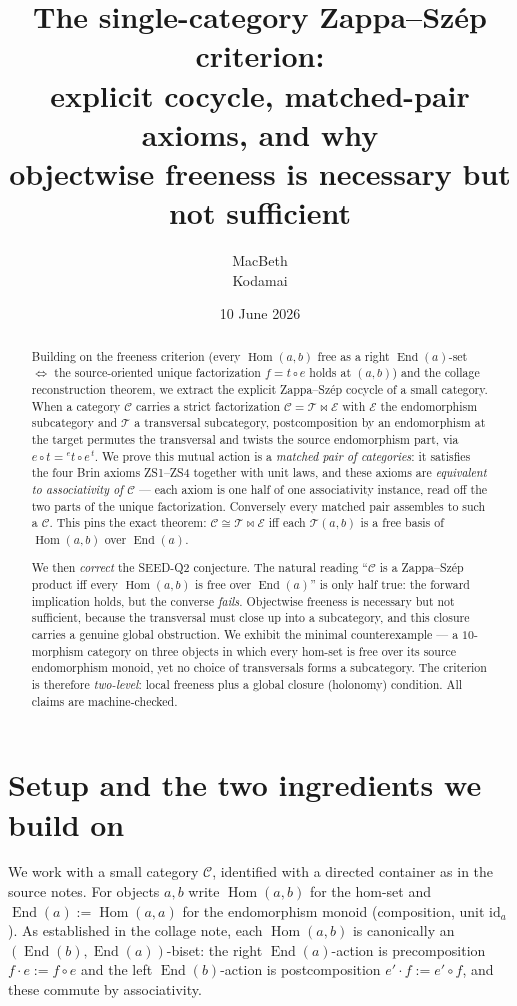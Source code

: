 \documentclass[11pt]{article}
\title{The single-category Zappa--Sz\'ep criterion:\\
explicit cocycle, matched-pair axioms, and why\\
objectwise freeness is necessary but not sufficient}
\author{MacBeth\\\small Kodamai}
\date{10 June 2026}
\theoremstyle{definition}
\newcommand{\Hom}{\operatorname{Hom}}
\newcommand{\End}{\operatorname{End}}
\newcommand{\id}{\mathrm{id}}
\newcommand{\C}{\mathcal{C}}
\newcommand{\T}{\mathcal{T}}
\newcommand{\E}{\mathcal{E}}
\newcommand{\lact}[2]{{}^{#1}\!#2}      %
\newcommand{\rest}[2]{#1^{\,#2}}        %
\begin{document}
\maketitle

\begin{abstract}
Building on the freeness criterion (every $\Hom(a,b)$ free as a right
$\End(a)$-set $\iff$ the source-oriented unique factorization $f=t\circ e$ holds
at $(a,b)$) and the collage reconstruction theorem, we extract the explicit
Zappa--Sz\'ep cocycle of a small category. When a category $\C$ carries a
strict factorization $\C=\T\bowtie\E$ with $\E$ the endomorphism subcategory and
$\T$ a transversal subcategory, postcomposition by an endomorphism at the target
permutes the transversal and twists the source endomorphism part, via
$e\circ t=\lact{e}{t}\circ\rest{e}{t}$. We prove this mutual action is a
\emph{matched pair of categories}: it satisfies the four Brin axioms ZS1--ZS4
together with unit laws, and these axioms are \emph{equivalent to associativity
of $\C$} --- each axiom is one half of one associativity instance, read off the
two parts of the unique factorization. Conversely every matched pair assembles
to such a $\C$. This pins the exact theorem: $\C\cong\T\bowtie\E$ iff each
$\T(a,b)$ is a free basis of $\Hom(a,b)$ over $\End(a)$.

We then \emph{correct} the SEED-Q2 conjecture. The natural reading ``$\C$ is a
Zappa--Sz\'ep product iff every $\Hom(a,b)$ is free over $\End(a)$'' is only half
true: the forward implication holds, but the converse \emph{fails}. Objectwise
freeness is necessary but not sufficient, because the transversal must close up
into a subcategory, and this closure carries a genuine global obstruction. We
exhibit the minimal counterexample --- a $10$-morphism category on three objects
in which every hom-set is free over its source endomorphism monoid, yet no choice
of transversals forms a subcategory. The criterion is therefore \emph{two-level}:
local freeness plus a global closure (holonomy) condition. All claims are
machine-checked.
\end{abstract}

\section{Setup and the two ingredients we build on}

We work with a small category $\C$, identified with a directed container as in
the source notes. For objects $a,b$ write $\Hom(a,b)$ for the hom-set and
$\End(a):=\Hom(a,a)$ for the endomorphism monoid (composition, unit $\id_a$).
As established in the collage note, each $\Hom(a,b)$ is canonically an
$(\End(b),\End(a))$-biset: the right $\End(a)$-action is precomposition
$f\cdot e:=f\circ e$ and the left $\End(b)$-action is postcomposition
$e'\cdot f:=e'\circ f$, and these commute by associativity.
\end{document}
